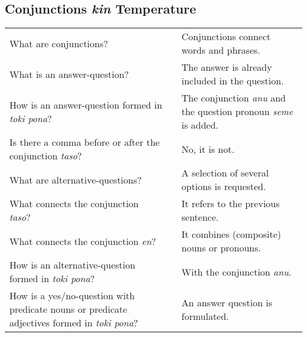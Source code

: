 \newpage
%
\subsection*{Conjunctions \textit{kin} Temperature}
\label{'conjunctions_temperature'}
%
\begin{supertabular}{p{5,5cm}|ll}
    What are conjunctions?                                                                              &  & Conjunctions connect words and phrases.                                       \\ %
    What is an answer-question?                                                                         &  & The answer is already included in the question.                               \\ %
    How is an answer-question formed in \textit{toki pona}?                                             &  & The conjunction \textit{anu} and the question pronoun \textit{seme} is added. \\ %
    Is there a comma before or after the conjunction \textit{taso}?                                     &  & No, it is not.                                                                \\ %
    What are alternative-questions?                                                                     &  & A selection of several options is requested.                                  \\ %
    What connects the conjunction \textit{taso}?                                                        &  & It refers to the previous sentence.                                           \\ %
    What connects the conjunction \textit{en}?                                                          &  & It combines (composite) nouns or pronouns.                                    \\ %
    How is an alternative-question formed in \textit{toki pona}?                                        &  & With the conjunction \textit{anu}.                                            \\ %
    How is a yes/no-question with predicate nouns or predicate adjectives formed in \textit{toki pona}? &  & An answer question is formulated.                                             \\ %
\end{supertabular}

